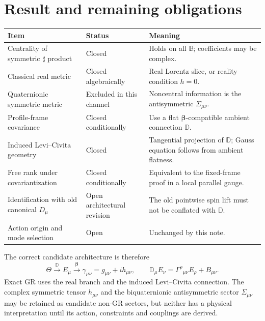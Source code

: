\documentclass[11pt,a4paper]{article}
\theoremstyle{remark}
\newcommand{\B}{\mathbb B}
\newcommand{\Db}{\mathbb D}
\newcommand{\betaC}{\boldsymbol\beta}
\begin{document}
\section{Result and remaining obligations}

\begin{center}
\begin{tabularx}{\textwidth}{>{\raggedright\arraybackslash}p{}
                              >{\raggedright\arraybackslash}p{}
                              >{\raggedright\arraybackslash}X}
\hline
Item & Status & Meaning \\
\hline
Centrality of symmetric $\sharp$ product & Closed & Holds on all $\B$; coefficients may be complex. \\
Classical real metric & Closed algebraically & Real Lorentz slice, or reality condition $h=0$. \\
Quaternionic symmetric metric & Excluded in this channel & Noncentral information is the antisymmetric $\Sigma_{\mu\nu}$. \\
Profile-frame covariance & Closed conditionally & Use a flat $\betaC$-compatible ambient connection $\Db$. \\
Induced Levi--Civita geometry & Closed & Tangential projection of $\Db$; Gauss equation follows from ambient flatness. \\
Free rank under covariantization & Closed conditionally & Equivalent to the fixed-frame proof in a local parallel gauge. \\
Identification with old canonical $D_\mu$ & Open architectural revision & The old pointwise spin lift must not be conflated with $\Db$. \\
Action origin and mode selection & Open & Unchanged by this note. \\
\hline
\end{tabularx}
\end{center}

The correct candidate architecture is therefore
\begin{equation}
 \boxed{
 \Theta\xrightarrow{\ \Db\ }E_\mu
 \xrightarrow{\ \betaC\ }\gamma_{\mu\nu}=g_{\mu\nu}+ih_{\mu\nu},
 \qquad
 \Db_\mu E_\nu=\Gamma^\rho{}_{\mu\nu}E_\rho+B_{\mu\nu}.}
 \label{eq:architecture}
\end{equation}
Exact GR uses the real branch and the induced Levi--Civita connection.  The
complex symmetric tensor $h_{\mu\nu}$ and the biquaternionic antisymmetric
sector $\Sigma_{\mu\nu}$ may be retained as candidate non-GR sectors, but
neither has a physical interpretation until its action, constraints and
couplings are derived.
\end{document}
